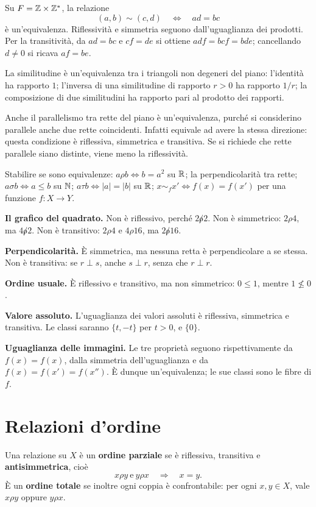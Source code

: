 \begin{esempio}
Su $F=\mathbb{Z}\times\mathbb{Z}^*$, la relazione
\[
(a,b)\sim(c,d)\quad\Longleftrightarrow\quad ad=bc
\]
è un'equivalenza. Riflessività e simmetria seguono dall'uguaglianza dei prodotti. Per la transitività, da $ad=bc$ e $cf=de$ si ottiene $adf=bcf=bde$; cancellando $d\ne0$ si ricava $af=be$.

La similitudine è un'equivalenza tra i triangoli non degeneri del piano: l'identità ha rapporto $1$; l'inversa di una similitudine di rapporto $r>0$ ha rapporto $1/r$; la composizione di due similitudini ha rapporto pari al prodotto dei rapporti.

Anche il parallelismo tra rette del piano è un'equivalenza, purché si considerino parallele anche due rette coincidenti. Infatti equivale ad avere la stessa direzione: questa condizione è riflessiva, simmetrica e transitiva. Se si richiede che rette parallele siano distinte, viene meno la riflessività.
\end{esempio}

\begin{esercizio}
Stabilire se sono equivalenze: $a\rho b\iff b=a^2$ su $\mathbb{R}$; la perpendicolarità tra rette; $a\sigma b\iff a\le b$ su $\mathbb{N}$; $a\tau b\iff |a|=|b|$ su $\mathbb{R}$; $x\sim_f x'\iff f(x)=f(x')$ per una funzione $f:X\to Y$.
\end{esercizio}
\begin{svolgimento}
\textbf{Il grafico del quadrato.} Non è riflessivo, perché $2\not\rho2$. Non è simmetrico: $2\rho4$, ma $4\not\rho2$. Non è transitivo: $2\rho4$ e $4\rho16$, ma $2\not\rho16$.

\textbf{Perpendicolarità.} È simmetrica, ma nessuna retta è perpendicolare a se stessa. Non è transitiva: se $r\perp s$, anche $s\perp r$, senza che $r\perp r$.

\textbf{Ordine usuale.} È riflessivo e transitivo, ma non simmetrico: $0\le1$, mentre $1\nleq0$.

\textbf{Valore assoluto.} L'uguaglianza dei valori assoluti è riflessiva, simmetrica e transitiva. Le classi saranno $\{t,-t\}$ per $t>0$, e $\{0\}$.

\textbf{Uguaglianza delle immagini.} Le tre proprietà seguono rispettivamente da $f(x)=f(x)$, dalla simmetria dell'uguaglianza e da $f(x)=f(x')=f(x'')$. È dunque un'equivalenza; le sue classi sono le fibre di $f$.
\end{svolgimento}

\section{Relazioni d'ordine}
\begin{definizione}
Una relazione su $X$ è un \textbf{ordine parziale} se è riflessiva, transitiva e \textbf{antisimmetrica}, cioè
\[
x\rho y\ \text{e}\ y\rho x\quad\Longrightarrow\quad x=y.
\]
È un \textbf{ordine totale} se inoltre ogni coppia è confrontabile: per ogni $x,y\in X$, vale $x\rho y$ oppure $y\rho x$.
\end{definizione}

